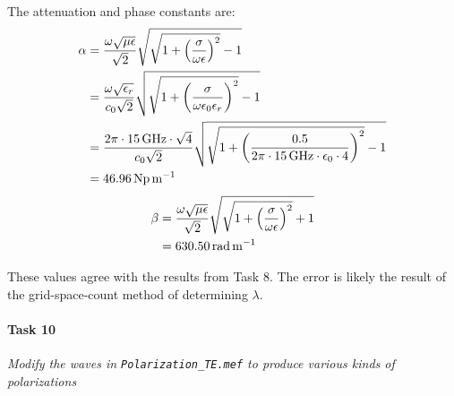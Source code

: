 The attenuation and phase constants are:
\begin{align*}
	\alpha &= { \omega \sqrt{\mu \epsilon} \over \sqrt{2} } \sqrt{\sqrt{1 + \left( {\sigma \over \omega \epsilon} \right)^2} - 1} \\
	&= { \omega \sqrt{\epsilon_r} \over c_0 \sqrt{2} } \sqrt{\sqrt{1 + \left( {\sigma \over \omega \epsilon_0 \epsilon_r} \right)^2} - 1} \\
	&= { 2 \pi \cdot \SI{15}{\giga\hertz} \cdot \sqrt{4} \over c_0 \sqrt{2} } \sqrt{\sqrt{1 + \left( {0.5 \over 2 \pi \cdot \SI{15}{\giga\hertz} \cdot \epsilon_0 \cdot 4} \right)^2} - 1} \\
	&= \SI{46.96}{\neper\per\meter}
\end{align*}
\begin{align*}
	\beta &= { \omega \sqrt{\mu \epsilon} \over \sqrt{2} } \sqrt{\sqrt{1 + \left( {\sigma \over \omega \epsilon} \right)^2} + 1} \\
	&= \SI{630.50}{\radian\per\meter}
\end{align*}

These values agree with the results from Task 8. The error is likely the result of the grid-space-count method of determining $\lambda$.

\paragraph{Task 10} \textit{Modify the waves in \texttt{Polarization\_TE.mef} to produce various kinds of polarizations}

